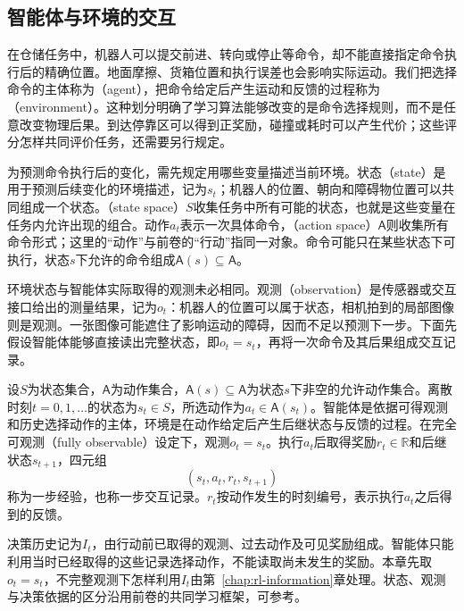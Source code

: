 \subsection{智能体与环境的交互}
\label{sec:rl-overview-interaction}

在仓储任务中，机器人可以提交前进、转向或停止等命令，却不能直接指定命令执行后的精确位置。地面摩擦、货箱位置和执行误差也会影响实际运动。我们把选择命令的主体称为（agent），把命令给定后产生运动和反馈的过程称为（environment）。这种划分明确了学习算法能够改变的是命令选择规则，而不是任意改变物理后果。到达停靠区可以得到正奖励，碰撞或耗时可以产生代价；这些评分怎样共同评价任务，还需要另行规定。

为预测命令执行后的变化，需先规定用哪些变量描述当前环境。状态（state）是用于预测后续变化的环境描述，记为$s_t$；机器人的位置、朝向和障碍物位置可以共同组成一个状态。（state space）$S$收集任务中所有可能的状态，也就是这些变量在任务内允许出现的组合。动作$a_t$表示一次具体命令，（action space）$\mathsf A$则收集所有命令形式；这里的“动作”与前卷的“行动”指同一对象。命令可能只在某些状态下可执行，状态$s$下允许的命令组成$\mathsf A(s)\subseteq\mathsf A$。

环境状态与智能体实际取得的观测未必相同。观测（observation）是传感器或交互接口给出的测量结果，记为$o_t$：机器人的位置可以属于状态，相机拍到的局部图像则是观测。一张图像可能遮住了影响运动的障碍，因而不足以预测下一步。下面先假设智能体能够直接读出完整状态，即$o_t=s_t$，再将一次命令及其后果组成交互记录。

\begin{definition}
  \label{def:rl-overview-interface}
  设$S$为状态集合，$\mathsf A$为动作集合，$\mathsf A(s)\subseteq\mathsf A$为状态$s$下非空的允许动作集合。离散时刻$t=0,1,\ldots$的状态为$s_t\in S$，所选动作为$a_t\in\mathsf A(s_t)$。智能体是依据可得观测和历史选择动作的主体，环境是在动作给定后产生后继状态与反馈的过程。在完全可观测（fully observable）设定下，观测$o_t=s_t$。执行$a_t$后取得奖励$r_t\in\mathbb R$和后继状态$s_{t+1}$，四元组
  \[
    (s_t,a_t,r_t,s_{t+1})
  \]
  称为一步经验，也称一步交互记录。$r_t$按动作发生的时刻编号，表示执行$a_t$之后得到的反馈。
\end{definition}

决策历史记为$I_t$，由行动前已取得的观测、过去动作及可见奖励组成。智能体只能利用当时已经取得的这些记录选择动作，不能读取尚未发生的奖励。本章先取$o_t=s_t$，不完整观测下怎样利用$I_t$由第~\ref{chap:rl-information}章处理。状态、观测与决策依据的区分沿用前卷的共同学习框架，可参考。

